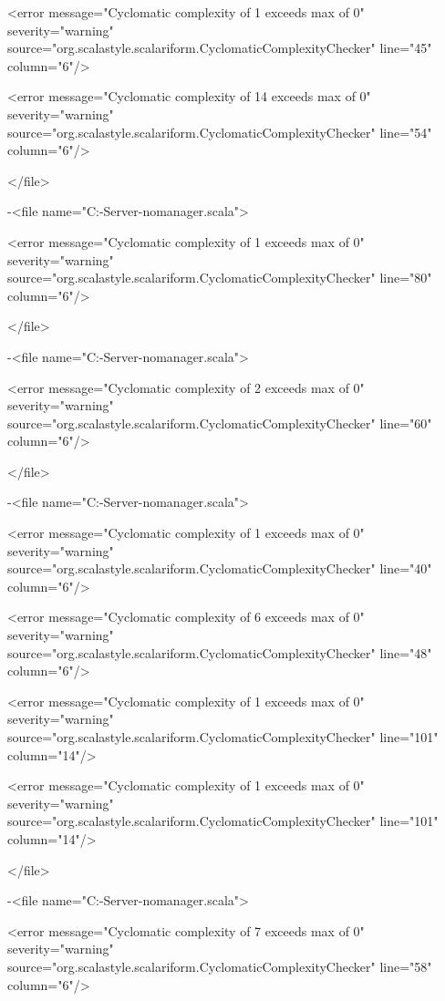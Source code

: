 \documentclass{scalatekids-article}
\begin{document}
<error message="Cyclomatic complexity of 1 exceeds max of 0" severity="warning" source="org.scalastyle.scalariform.CyclomaticComplexityChecker" line="45" column="6"/>

<error message="Cyclomatic complexity of 14 exceeds max of 0" severity="warning" source="org.scalastyle.scalariform.CyclomaticComplexityChecker" line="54" column="6"/>

</file>


-<file name="C:\Users\Davide\Desktop\Actorbase-Server-nomanager\src\main\scala\com\actorbase\actorsystem\clientactor\ClientActor.scala">

<error message="Cyclomatic complexity of 1 exceeds max of 0" severity="warning" source="org.scalastyle.scalariform.CyclomaticComplexityChecker" line="80" column="6"/>

</file>


-<file name="C:\Users\Davide\Desktop\Actorbase-Server-nomanager\src\main\scala\com\actorbase\actorsystem\httpserver\HTTPServer.scala">

<error message="Cyclomatic complexity of 2 exceeds max of 0" severity="warning" source="org.scalastyle.scalariform.CyclomaticComplexityChecker" line="60" column="6"/>

</file>


-<file name="C:\Users\Davide\Desktop\Actorbase-Server-nomanager\src\main\scala\com\actorbase\actorsystem\warehouseman\Warehouseman.scala">

<error message="Cyclomatic complexity of 1 exceeds max of 0" severity="warning" source="org.scalastyle.scalariform.CyclomaticComplexityChecker" line="40" column="6"/>

<error message="Cyclomatic complexity of 6 exceeds max of 0" severity="warning" source="org.scalastyle.scalariform.CyclomaticComplexityChecker" line="48" column="6"/>

<error message="Cyclomatic complexity of 1 exceeds max of 0" severity="warning" source="org.scalastyle.scalariform.CyclomaticComplexityChecker" line="101" column="14"/>

<error message="Cyclomatic complexity of 1 exceeds max of 0" severity="warning" source="org.scalastyle.scalariform.CyclomaticComplexityChecker" line="101" column="14"/>

</file>


-<file name="C:\Users\Davide\Desktop\Actorbase-Server-nomanager\src\main\scala\com\actorbase\actorsystem\utils\CryptoUtils.scala">

<error message="Cyclomatic complexity of 7 exceeds max of 0" severity="warning" source="org.scalastyle.scalariform.CyclomaticComplexityChecker" line="58" column="6"/>
\end{document}
